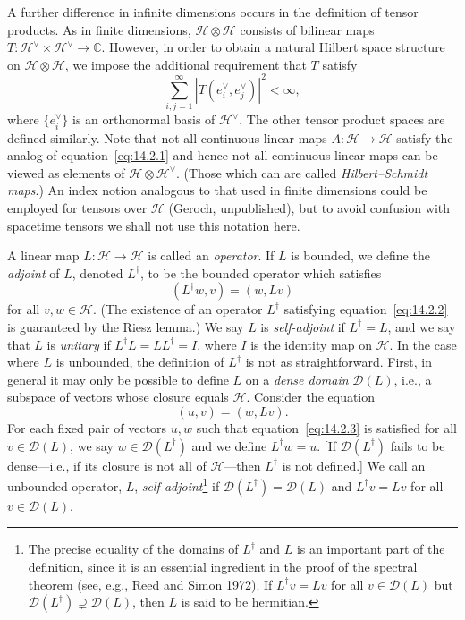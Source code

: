 A further difference in infinite dimensions occurs in the definition of tensor
products. As in finite dimensions, \(\mathcal H\otimes\mathcal H\) consists of
bilinear maps \(T:\mathcal H^\vee\times\mathcal H^\vee\longrightarrow\mathbb C\).
However, in order to obtain a natural Hilbert space structure on
\(\mathcal H\otimes\mathcal H\), we impose the additional requirement that \(T\)
satisfy
\begin{equation}
  \sum_{i,j=1}^{\infty}\left|T(e_i^\vee,e_j^\vee)\right|^2<\infty,
  \tag{14.2.1}\label{eq:14.2.1}
\end{equation}
where \(\{e_i^\vee\}\) is an orthonormal basis of \(\mathcal H^\vee\). The other tensor
product spaces are defined similarly. Note that not all continuous linear maps
\(A:\mathcal H\longrightarrow\mathcal H\) satisfy the analog of
equation~\eqref{eq:14.2.1} and hence not all continuous linear maps can be viewed as
elements of \(\mathcal H\otimes\mathcal H^\vee\). (Those which can are called
\emph{Hilbert--Schmidt maps}.) An index notion analogous to that used in finite
dimensions could be employed for tensors over \(\mathcal H\) (Geroch, unpublished),
but to avoid confusion with spacetime tensors we shall not use this notation here.

A linear map \(L:\mathcal H\longrightarrow\mathcal H\) is called an
\emph{operator}. If \(L\) is bounded, we define the \emph{adjoint} of \(L\),
denoted \(L^\dagger\), to be the bounded operator which satisfies
\begin{equation}
  (L^\dagger w,v)=(w,Lv)
  \tag{14.2.2}\label{eq:14.2.2}
\end{equation}
for all \(v,w\in\mathcal H\). (The existence of an operator \(L^\dagger\)
satisfying equation~\eqref{eq:14.2.2} is guaranteed by the Riesz lemma.) We say
\(L\) is \emph{self-adjoint} if \(L^\dagger=L\), and we say that \(L\) is
\emph{unitary} if \(L^\dagger L=LL^\dagger=I\), where \(I\) is the identity map
on \(\mathcal H\). In the case where \(L\) is unbounded, the definition of
\(L^\dagger\) is not as straightforward. First, in general it may only be possible to
define \(L\) on a \emph{dense domain} \(\mathcal D(L)\), i.e., a subspace of
vectors whose closure equals \(\mathcal H\). Consider the equation
\begin{equation}
  (u,v)=(w,Lv).
  \tag{14.2.3}\label{eq:14.2.3}
\end{equation}
For each fixed pair of vectors \(u,w\) such that equation~\eqref{eq:14.2.3} is
satisfied for all \(v\in\mathcal D(L)\), we say \(w\in\mathcal D(L^\dagger)\) and
we define \(L^\dagger w=u\). [If \(\mathcal D(L^\dagger)\) fails to be dense---i.e.,
if its closure is not all of \(\mathcal H\)---then \(L^\dagger\) is not defined.] We
call an unbounded operator, \(L\), \emph{self-adjoint}\footnote{The precise equality
of the domains of \(L^\dagger\) and \(L\) is an important part of the definition,
since it is an essential ingredient in the proof of the spectral theorem (see, e.g., Reed
and Simon 1972). If \(L^\dagger v=Lv\) for all \(v\in\mathcal D(L)\) but
\(\mathcal D(L^\dagger)\supsetneq\mathcal D(L)\), then \(L\) is said to be
hermitian.} if \(\mathcal D(L^\dagger)=\mathcal D(L)\) and \(L^\dagger v=Lv\)
for all \(v\in\mathcal D(L)\).

